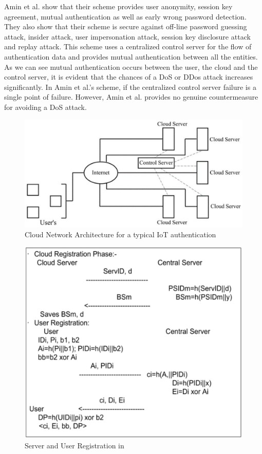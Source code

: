 \begin{multicols}{2}
Amin et al. show that their scheme provides user anonymity, session key agreement, mutual authentication as well as early wrong password detection. They also show that their scheme is secure against off-line password guessing attack, insider attack, user impersonation attack, session key disclosure attack and replay attack. This scheme uses a centralized control server for the flow of authentication data and provides mutual authentication between all the entities. As we can see mutual authentication occurs between the user, the cloud and the control server, it is evident that the chances of a DoS or DDos attack increases significantly. In Amin et al.'s scheme, if the centralized control server failure is a single point of failure. However, Amin et al. provides no genuine countermeasure for avoiding a DoS attack.
\end{multicols}

\begin{figure}[!ht]
\centering
\includegraphics[scale=.77]{src/Figures/chap2/6.eps}
\caption{Cloud Network Architecture for a typical IoT authentication}\label{chap2-fig6}
\end{figure}

\medskip

\begin{figure}[!ht]
\centering
\includegraphics[scale=.7]{src/Figures/chap2/7.eps}
\caption{Server and User Registration in \cite{chap2-key20}}\label{chap2-fig7}
\end{figure}

